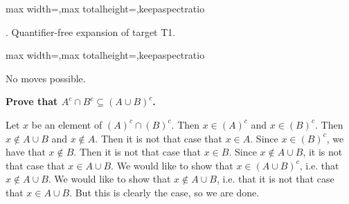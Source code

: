 \documentclass[a4paper,twoside,12pt]{article} %
\makeatletter
\DeclareRobustCommand{\_}{%
  \leavevmode\vbox{%
    \hrule\@width.4em
          \@height-.16ex
          \@depth\dimexpr.16ex+.28pt\relax}}
\newcommand\Tstrut{\rule{0pt}{2.4ex}}
\newcommand\Bstrut{\rule[-1.1ex]{0pt}{0pt}}
\newenvironment{fit}{\begin{adjustbox}{max width=\textwidth,max totalheight=\textheight,keepaspectratio}}{\end{adjustbox}}
\makeatother
\begin{document}
\bigskip
\begin{steps}
\begin{fit}%
\end{fit}
\smallskip

. Quantifier-free expansion of target T1.\nopagebreak[4] 
\nopagebreak[4] 
\smallskip\nopagebreak[4] 

\begin{fit}%
\end{fit}

No moves possible.
\cleardoublepage

\end{steps}
{\begin{center} \large \textbf{Prove that $A^c \cap B^c \subseteq (A \cup B)^c$.}\end{center}}\nopagebreak[4]

\begin{center}
\begin{minipage}{120mm}
Let $x$ be an element of $(A)^c\cap (B)^c$. Then $x\in (A)^c$ and $x\in (B)^c$. Then $x\notin A\cup B$ and $x\notin A$. Then it is not that case that $x\in A$. Since $x\in (B)^c$, we have that $x\notin B$. Then it is not that case that $x\in B$. Since $x\notin A\cup B$, it is not that case that $x\in A\cup B$. We would like to show that $x\in (A\cup B)^c$, i.e. that $x\notin A\cup B$. We would like to show that $x\notin A\cup B$, i.e. that it is not that case that $x\in A\cup B$. But this is clearly the case, so we are done.
\end{minipage}
\end{center}
\end{document}

